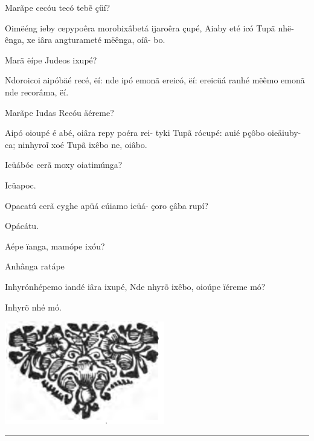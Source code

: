 \documentclass[openany,titlepage,12pt]{book}
\begin{document}
\begin{altereven}
    \item Marãpe cecóu tecó teb\~e çüí?
    \item Oimëéng ieby cepypoêra morobixâbetá
        ijaroêra çupé, Aiaby eté icó Tupã nhë-\linebreak
        \newpage
        ênga, xe iâra angturameté mëênga, oíâ-\linebreak
        bo.
    \item Marã ëípe Judeos ixupé?
    \item Ndoroicoi aipóbäé recé, ëí: nde ipó\linebreak
        emonã ereicó, ëí: ereicüá ranhé mëêmo
        emonã nde recorâma, ëí.
    \item Marãpe Iudas Recóu äéreme?
    \item Aipó oioupé é abé, oiâra repy poéra rei-
        tyki Tupã rócupé: auié pçôbo oieäiuby-
        ca; ninhyro\~i xoé Tupã ixêbo ne, oiâbo.
    \item Icüábóc cerã moxy oiatimúnga?
    \item Icüapoc.
    \item Opacatú cerã cyghe apüá cúiamo icüá-
        çoro çâba rupí?
    \item Opácátu.
    \item Aépe ïanga, mamópe ixóu?
    \item Anhânga ratápe
    \item Inhyrónhépemo iandé iâra ixupé, Nde
        nhyrõ ixêbo, oioúpe ïéreme mó?
    \item Inhyrõ nhé mó.    

\end{altereven}

\begin{center}
    \vspace*{20pt}
    \includegraphics[scale=0.66]{13.livro3_fim.png}
\end{center}

\newpage

\vspace{2pt}
\par\noindent\rule{\textwidth}{0.4pt}
\unskip\vspace*{2pt}
\end{document}
